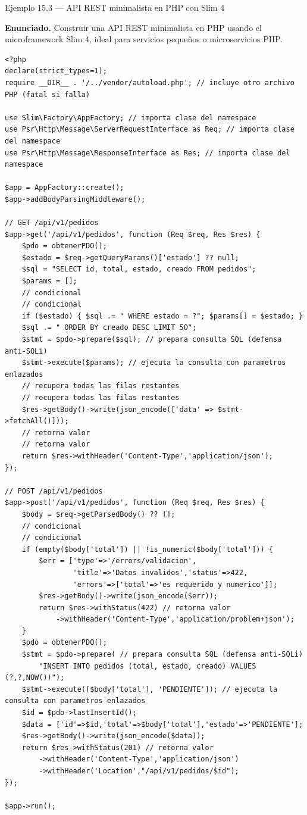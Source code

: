 \begin{cajaejemplo}{Ejemplo 15.3 --- API REST minimalista en PHP con Slim 4}

\textbf{Enunciado.} Construir una API REST minimalista en PHP usando el microframework Slim 4, ideal para servicios pequeños o microservicios PHP.

\begin{lstlisting}[style=php,caption={public/index.php},label=lst:15.5]
<?php
declare(strict_types=1);
require __DIR__ . '/../vendor/autoload.php'; // incluye otro archivo PHP (fatal si falla)

use Slim\Factory\AppFactory; // importa clase del namespace
use Psr\Http\Message\ServerRequestInterface as Req; // importa clase del namespace
use Psr\Http\Message\ResponseInterface as Res; // importa clase del namespace

$app = AppFactory::create();
$app->addBodyParsingMiddleware();

// GET /api/v1/pedidos
$app->get('/api/v1/pedidos', function (Req $req, Res $res) {
    $pdo = obtenerPDO();
    $estado = $req->getQueryParams()['estado'] ?? null;
    $sql = "SELECT id, total, estado, creado FROM pedidos";
    $params = [];
    // condicional
    // condicional
    if ($estado) { $sql .= " WHERE estado = ?"; $params[] = $estado; }
    $sql .= " ORDER BY creado DESC LIMIT 50";
    $stmt = $pdo->prepare($sql); // prepara consulta SQL (defensa anti-SQLi)
    $stmt->execute($params); // ejecuta la consulta con parametros enlazados
    // recupera todas las filas restantes
    // recupera todas las filas restantes
    $res->getBody()->write(json_encode(['data' => $stmt->fetchAll()]));
    // retorna valor
    // retorna valor
    return $res->withHeader('Content-Type','application/json');
});

// POST /api/v1/pedidos
$app->post('/api/v1/pedidos', function (Req $req, Res $res) {
    $body = $req->getParsedBody() ?? [];
    // condicional
    // condicional
    if (empty($body['total']) || !is_numeric($body['total'])) {
        $err = ['type'=>'/errors/validacion',
                'title'=>'Datos invalidos','status'=>422,
                'errors'=>['total'=>'es requerido y numerico']];
        $res->getBody()->write(json_encode($err));
        return $res->withStatus(422) // retorna valor
            ->withHeader('Content-Type','application/problem+json');
    }
    $pdo = obtenerPDO();
    $stmt = $pdo->prepare( // prepara consulta SQL (defensa anti-SQLi)
        "INSERT INTO pedidos (total, estado, creado) VALUES (?,?,NOW())");
    $stmt->execute([$body['total'], 'PENDIENTE']); // ejecuta la consulta con parametros enlazados
    $id = $pdo->lastInsertId();
    $data = ['id'=>$id,'total'=>$body['total'],'estado'=>'PENDIENTE'];
    $res->getBody()->write(json_encode($data));
    return $res->withStatus(201) // retorna valor
        ->withHeader('Content-Type','application/json')
        ->withHeader('Location',"/api/v1/pedidos/$id");
});

$app->run();
\end{lstlisting}
\end{cajaejemplo}

